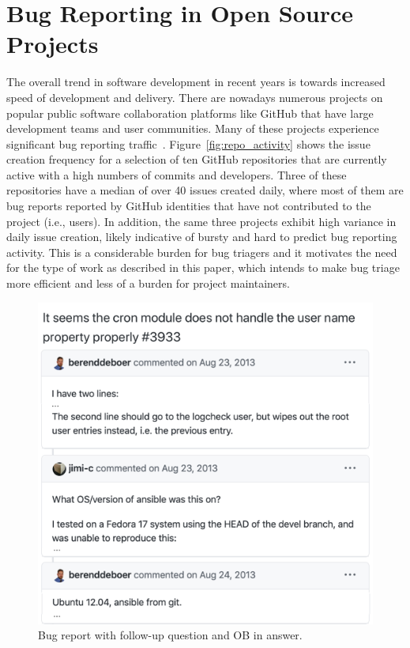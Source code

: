 \section{Bug Reporting in Open Source Projects}


The overall trend in software development in recent years is towards increased
speed of development and delivery. There are nowadays numerous projects on popular
public software collaboration platforms like GitHub that have large development
teams and user communities. Many of these projects experience significant
bug reporting traffic~\cite{Zhang2014ASO}. Figure~\ref{fig:repo_activity} shows the issue creation
frequency for a selection of ten GitHub repositories that are currently active
with a high numbers of commits and developers. Three of these repositories have
a median of over 40 issues created daily, where most of them are bug reports reported by
GitHub identities that have not contributed to the project (i.e., users). In addition,
the same three projects exhibit high variance in daily issue creation, likely indicative
of bursty and hard to predict bug reporting activity. This is a
considerable burden for bug triagers and it motivates the need for the type of work
as described in this paper, which intends to make bug triage more efficient and less of
a burden for project maintainers.


\begin{figure}[t]
\centering
\includegraphics[width=0.99\linewidth]{figures/bug_report.pdf}
\caption{Bug report with follow-up question and OB in answer.}
\label{fig:bug_report}
\end{figure}

